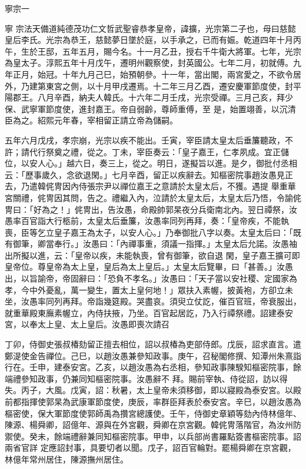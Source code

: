 
\begin{pinyinscope}

 寧宗一



 寧
 宗法天備道純德茂功仁文哲武聖睿恭孝皇帝，諱擴，光宗第二子也，母曰慈懿皇后李氏。光宗為恭王，慈懿夢日墜於庭，以手承之，已而有娠。乾道四年十月丙
 午，生於王邸，五年五月，賜今名。十一月乙丑，授右千牛衛大將軍。七年，光宗為皇太子。淳熙五年十月戊午，遷明州觀察使，封英國公。七年二月，初就傅。九年正月，始冠。十年九月己巳，始預朝參。十一年，當出閣，兩宮愛之，不欲令居外，乃建第東宮之側，以十月甲戌遷焉。十二年三月乙酉，遷安慶軍節度使，封平陽郡王。八月辛酉，納夫人韓氏。十六年二月壬戌，光宗受禪。三月己亥，拜少保、武寧軍節度使，進封嘉王。帝自弱齡，尊師重傅，至
 是，始置翊善，以沉清臣為之。紹熙元年春，宰相留正請立帝為儲嗣。



 五年六月戊戌，孝宗崩，光宗以疾不能出。壬寅，宰臣請太皇太后垂簾聽政，不許；請代行祭奠之禮，從之。丁未，宰臣奏云：「皇子嘉王，仁孝夙成。宜正儲位，以安人心。」越六日，奏三上，從之。明日，遂擬旨以進。是夕，御批付丞相云：「歷事歲久，念欲退閑。」七月辛酉，留正以疾辭去。知樞密院事趙汝愚見正去，乃遣韓侂冑因內侍張宗尹以禪位嘉王之意請於太皇太后，不獲。遇提
 舉重華宮關禮，侂冑因其問，告之。禮繼入內，泣請於太皇太后，太皇太后乃悟，令諭侂冑曰：「好為之！」侂冑出，告汝愚，命殿帥郭杲夜分兵衛南北內。翌日禫祭，汝愚率百官詣大行柩前，太皇太后垂簾，汝愚率同列再拜，奏：「皇帝疾，不能執喪，臣等乞立皇子嘉王為太子，以安人心。」乃奉御批八字以奏。太皇太后曰：「既有御筆，卿當奉行。」汝愚曰：「內禪事重，須議一指揮。」太皇太后允諾。汝愚袖出所擬以進，云：「皇帝以疾，未能執喪，曾有御筆，欲自退
 閑，皇子嘉王擴可即皇帝位。尊皇帝為太上皇，皇后為太上皇后。」太皇太后覽畢，曰「甚善。」汝愚出，以旨諭帝，帝固辭曰：「恐負不孝名。」汝愚曰：「天子當以安社稷、定國家為孝，今中外憂亂，萬一變生，置太上皇何地！」眾扶入素幄，披黃袍，方卻立未坐，汝愚率同列再拜。帝詣幾筵殿。哭盡哀。須臾立仗訖，催百官班，帝衰服出，就重華殿東廡素幄立，內侍扶掖，乃坐。百官起居訖，乃入行禫祭禮。詔建泰安宮，以奉太上皇、太上皇后。汝愚即喪次請召



 丁卯，侍御史張叔椿劾留正擅去相位，詔以叔椿為吏部侍郎。戊辰，詔求直言。遣鄭湜使金告禪位。己巳，以趙汝愚兼參知政事。庚午，召秘閣修撰、知潭州朱熹詣行在。壬申，建泰安宮。乙亥，以趙汝愚為右丞相，參知政事陳騤知樞密院事，餘端禮參知政事，仍兼同知樞密院事。汝愚辭不
 拜。賜前宰執、侍從詔，訪以得失。丙子，大風。戊寅，詔：秋暑，太上皇帝未須移御，即以寢殿為泰安宮。以殿前都指揮使郭杲為武康軍節度使，庚辰，率群臣拜表於泰安宮。辛巳，以趙汝愚為樞密使，保大軍節度使郭師禹為攢宮總護使。壬午，侍御史章穎等劾內侍林億年、陳源、楊舜卿，詔億年、源與在外宮觀，舜卿在京宮觀。韓侂冑落階官，為汝州防禦使。癸未，餘端禮辭兼同知樞密院事。甲申，以兵部尚書羅點簽書樞密院事。詔兩省官詳
 定應詔封事，具要切者以聞。戊子，詔百官輪對。罷楊舜卿在京宮觀，林億年常州居住，陳源撫州居住。




\end{pinyinscope}
